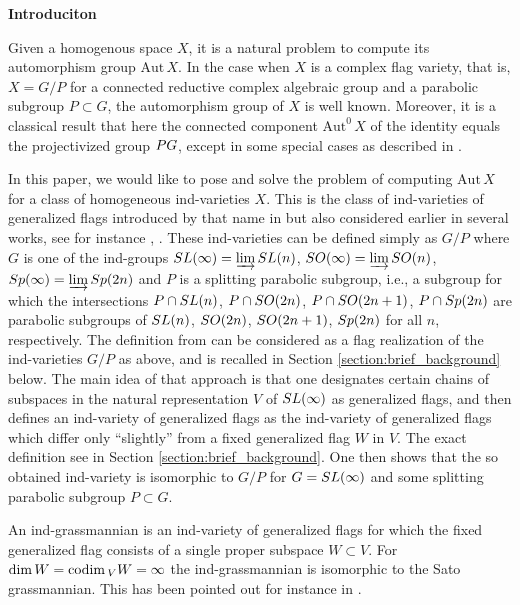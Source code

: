 \documentclass[11pt, a4paper]{article}
\begin{document}
\begin{center}
    {\large \bfseries Introduciton}
\end{center}

Given a homogenous space $X$, it is a natural problem to compute its automorphism group $\mathrm{Aut}\,X$. In the case when $X$ is a complex flag variety, that is, $X=G/P$ for a connected reductive complex algebraic group and a parabolic subgroup $P\subset G$, the automorphism group of $X$ is well known. Moreover, it is a classical result that here the connected component $\mathrm{Aut}^{0}\, X$ of the identity equals the projectivized group $P G$, except in some special cases as described in \cite{Onishchik}.

In this paper, we would like to pose and solve the problem of computing $\mathrm{Aut}\, X$ for a class of homogeneous ind-varieties $X$. This is the class of ind-varieties of generalized flags introduced by that name in \cite{DimitrovPenkov} but also considered earlier in several works, see for instance \cite{DmitrovPenkovWolf}, \cite{NatarajanRodriguez-CarringtonWolf}. These ind-varieties can be defined simply as $G/P$ where $G$ is one of the ind-groups $SL(\infty)=\varinjlim SL(n)$, $SO(\infty)=\varinjlim SO(n)$, $Sp(\infty)=\varinjlim Sp(2n)$ and $P$ is a splitting parabolic subgroup, i.e., a subgroup for which the intersections $P\cap SL(n)$, $P\cap SO(2n)$, $P\cap SO(2n+1)$, $P\cap Sp(2n)$ are parabolic subgroups of $SL(n)$, $SO(2n)$, $SO(2n+1)$, $Sp(2n)$ for all $n$, respectively. %
The definition from \cite{DimitrovPenkov} can be considered as a
    flag realization of the ind-varieties $G/P$ as above, and is recalled in Section \ref{section:brief_background} below. The main idea of that approach is that one designates
certain chains of subspaces in the natural representation $V$ of $SL(\infty)$ as generalized flags, and then defines an ind-variety of generalized flags as the ind-variety of generalized flags which differ only ``slightly'' from a fixed generalized flag $W$ in $V$. The exact definition see
in Section \ref{section:brief_background}. One then shows that the so obtained ind-variety is isomorphic to $G/P$ for $G=SL(\infty)$ and some splitting parabolic subgroup $P\subset G$.

An ind-grassmannian is an ind-variety of generalized flags for which the fixed generalized flag consists of a single proper subspace $W\subset V$. For $\dim W=\mathrm{codim}\,_V W=\infty$ %
the ind-grassmannian is isomorphic to the Sato grassmannian. This has been pointed out for instance in \cite{GattoSalehyan}.
\end{document}
